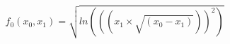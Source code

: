 \documentclass{article}
\begin{document}
\begin{equation}
f_0(x_0,x_1)= \sqrt{ln( (\left(x_1 \times  \sqrt{\left(x_0 - x_1\right) }\right) )^2) }
\end{equation}
\end{document}
